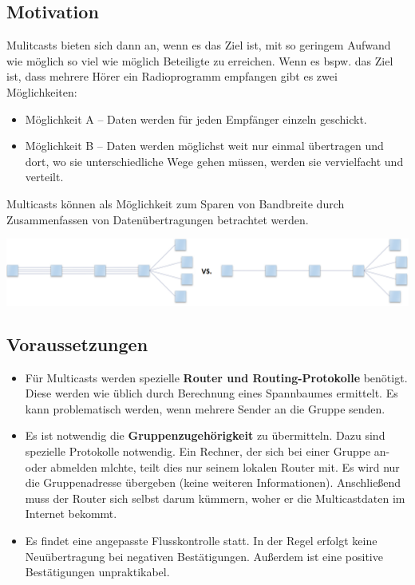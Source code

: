 \documentclass{article} %
\begin{document}
\subsection{Motivation}
Mulitcasts bieten sich dann an, wenn es das Ziel ist, mit so geringem Aufwand wie möglich so viel wie möglich Beteiligte zu erreichen. Wenn es bspw. das Ziel ist, dass mehrere Hörer ein Radioprogramm empfangen gibt es zwei Möglichkeiten:
	\begin{itemize}
	\item Möglichkeit A – Daten werden für jeden Empfänger einzeln geschickt. 
	\item Möglichkeit B – Daten werden möglichst weit nur einmal übertragen und dort, wo sie unterschiedliche Wege gehen müssen, werden sie vervielfacht und verteilt. 
	\end{itemize}
Multicasts können als  Möglichkeit zum Sparen von Bandbreite durch Zusammenfassen von Datenübertragungen betrachtet werden.
	\begin{center}
		\includegraphics[width=17cm]{img/multicast.png}
	\end{center}

\subsection{Voraussetzungen}
	\begin{itemize}
	\item Für Multicasts werden spezielle \textbf{Router und Routing-Protokolle} benötigt. Diese werden wie üblich durch Berechnung eines Spannbaumes ermittelt. Es kann problematisch werden, wenn mehrere Sender an die Gruppe senden.
	\item Es ist notwendig die \textbf{Gruppenzugehörigkeit} zu übermitteln. Dazu sind spezielle Protokolle notwendig. Ein Rechner, der sich bei einer Gruppe an- oder abmelden mlchte, teilt dies nur seinem lokalen Router mit. Es wird nur die Gruppenadresse übergeben (keine weiteren Informationen). Anschließend muss der Router sich selbst darum kümmern, woher er die Multicastdaten im Internet bekommt. 
	\item Es findet eine angepasste Flusskontrolle statt. In der Regel erfolgt keine Neuübertragung bei negativen Bestätigungen. Außerdem ist eine positive Bestätigungen unpraktikabel.
	\end{itemize}
\end{document}
